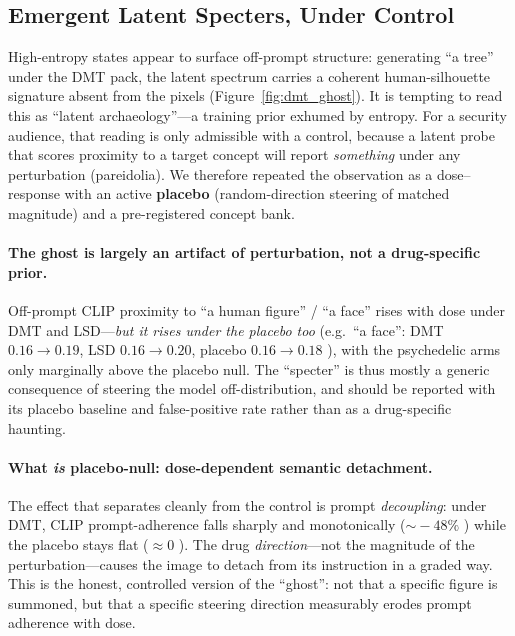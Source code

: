 \subsection{Emergent Latent Specters, Under Control}
High-entropy states appear to surface off-prompt structure: generating ``a tree'' under the DMT pack,
the latent spectrum carries a coherent human-silhouette signature absent from the pixels
(Figure~\ref{fig:dmt_ghost}). It is tempting to read this as ``latent archaeology''---a training prior
exhumed by entropy. For a security audience, that reading is only admissible with a control, because a
latent probe that scores proximity to a target concept will report \emph{something} under any
perturbation (pareidolia). We therefore repeated the observation as a dose--response with an active
\textbf{placebo} (random-direction steering of matched magnitude) and a pre-registered concept bank.

\paragraph{The ghost is largely an artifact of perturbation, not a drug-specific prior.} Off-prompt
CLIP proximity to ``a human figure'' / ``a face'' rises with dose under DMT and LSD---\emph{but it
rises under the placebo too} (e.g.\ ``a face'': DMT $0.16\!\to\!0.19$, LSD $0.16\!\to\!0.20$, placebo
$0.16\!\to\!0.18$ %
), with the psychedelic arms only marginally above the placebo null. The ``specter'' is thus mostly a
generic consequence of steering the model off-distribution, and should be reported with its placebo
baseline and false-positive rate rather than as a drug-specific haunting.

\paragraph{What \emph{is} placebo-null: dose-dependent semantic detachment.} The effect that
separates cleanly from the control is prompt \emph{decoupling}: under DMT, CLIP prompt-adherence falls
sharply and monotonically ($\sim\!-48\%$ %
) while the placebo stays flat ($\approx\!0$ %
). The drug \emph{direction}---not the magnitude of the perturbation---causes the image to detach from
its instruction in a graded way. This is the honest, controlled version of the ``ghost'': not that a
specific figure is summoned, but that a specific steering direction measurably erodes prompt
adherence with dose.

